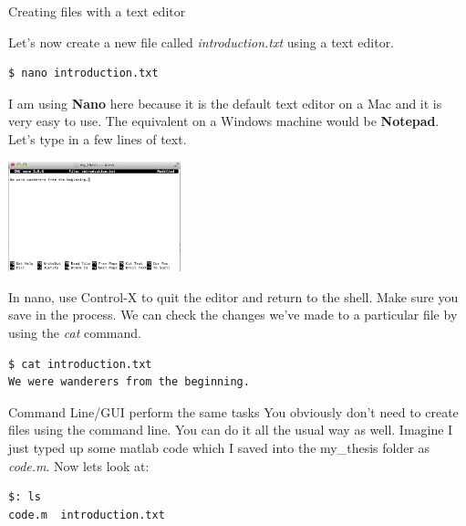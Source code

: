 \documentclass[10pt,leqno]{beamer}
\begin{document}
\begin{frame}[fragile]{Creating files with a text editor}

Let's now create a new file called \emph{introduction.txt} using a text editor.
\begin{lstlisting}
$ nano introduction.txt
\end{lstlisting}
I am using \textbf{Nano} here because it is the default text editor on a Mac and it is very easy to use. The equivalent on a Windows machine would be \textbf{Notepad}. Let's type in a few lines of text.
\begin{center}
\includegraphics[width=5cm]{./auxfiles/nano.jpg}
\end{center}
In nano, use Control-X to quit the editor and return to the shell. Make sure you save in the process. We can check the changes we've made to a particular file by using the \emph{cat} command.
\begin{lstlisting}
$ cat introduction.txt
We were wanderers from the beginning.
\end{lstlisting}
\end{frame}

\begin{frame}[fragile]{Command Line/GUI perform the same tasks}
You obviously don't need to create files using the command line. You can do it all the usual way as well. Imagine I just typed up some matlab code which I saved into the my\_thesis folder as \emph{code.m}. Now lets look at:
\begin{lstlisting}
$: ls
code.m	introduction.txt
\end{lstlisting}

\end{frame}



\begin{frame}[plain]{}



\end{frame}

\end{document}
